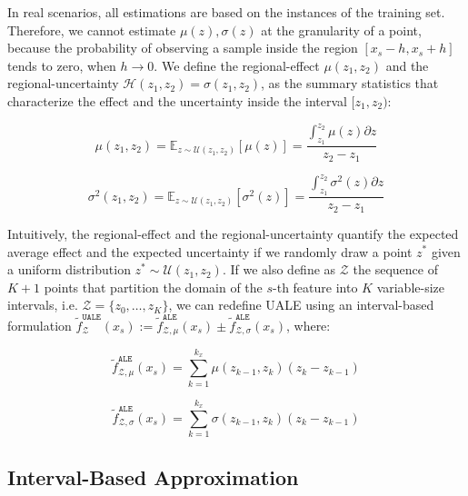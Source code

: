 \documentclass[twoside]{article}
\begin{document}
In real scenarios, all estimations are based on the instances of the
training set. Therefore, we cannot estimate \(\mu(z), \sigma(z)\) at
the granularity of a point, because the probability of observing a
sample inside the region \([x_s - h, x_s + h]\) tends to zero, when
\(h \to 0\). We define the regional-effect \(\mu(z_1, z_2)\) and the
regional-uncertainty \(\mathcal{H}(z_1, z_2) = \sigma(z_1, z_2)\), as the summary statistics
that characterize the effect and the uncertainty inside the interval
\([z_1, z_2)\):

\begin{equation}
  \label{eq:mu_bin}
    \mu(z_1, z_2) = \mathbb{E}_{z \sim \mathcal{U}(z_1,z_2)} [\mu(z)]
    = \frac{\int_{z_1}^{z_2} \mu(z) \partial z}{z_2 - z_1}
\end{equation}

\begin{equation}
  \label{eq:var_bin}
  \sigma^2(z_1, z_2) = \mathbb{E}_{z \sim \mathcal{U}(z_1,z_2)} [\sigma^2(z)] =  \frac{\int_{z_1}^{z_2} \sigma^2(z)  \partial z}{z_2 - z_1}
\end{equation}

%
Intuitively, the regional-effect and the regional-uncertainty quantify
the expected average effect and the expected uncertainty if we
randomly draw a point \(z^*\) given a uniform distribution
\(z^* \sim \mathcal{U}(z_1, z_2)\). If we also define as
\(\mathcal{Z}\) the sequence of \(K+1\) points that partition the
domain of the \(s\)-th feature into \(K\) variable-size intervals,
i.e.  \(\mathcal{Z} = \{z_0, \ldots, z_K\}\), we can redefine UALE
using an interval-based formulation
\(\tilde{f}^{\mathtt{UALE}}_{\mathcal{Z}}(x_s):= \tilde{f}^{\mathtt{ALE}}_{\mathcal{Z}, \mu}(x_s)
\pm \tilde{f}^{\mathtt{ALE}}_{\mathcal{Z}, \sigma}(x_s)\), where:

\begin{equation}
  \label{eq:ALE_2}
  \tilde{f}^{\mathtt{ALE}}_{\mathcal{Z}, \mu}(x_s) = \sum_{k=1}^{k_x} \mu(z_{k-1}, z_k) (z_k - z_{k-1})
\end{equation}

\begin{equation}
  \label{eq:ALE_accumulated_var}
  \tilde{f}^{\mathtt{ALE}}_{\mathcal{Z}, \sigma}(x_s) =  \sum_{k=1}^{k_x} \sigma(z_{k-1}, z_k) (z_k - z_{k-1})
\end{equation}
%

\subsection{Interval-Based Approximation}
\label{sec:UALE-approximation}
\end{document}
